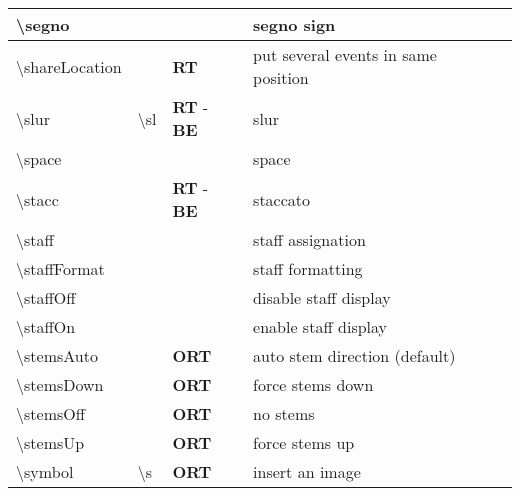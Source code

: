 \documentclass[a4paper, landscape, 11pt]{article}
\begin{document}
\begin{tabularx}{\linewidth}{p{3cm}p{5cm}lll}
    \hline
    \textbackslash{}segno&&&segno sign&\\
    \hline
    \textbackslash{}shareLocation&&\textbf{RT}&put several events in same position&\\
    \hline
    \textbackslash{}slur&\textbackslash{}sl&\textbf{RT} - \textbf{BE}&slur&\\
    \hline
    \textbackslash{}space&&&space&\\
    \hline
    \textbackslash{}stacc&&\textbf{RT} - \textbf{BE}&staccato&\\
    \hline
    \textbackslash{}staff&&&staff assignation&\\
    \hline
    \textbackslash{}staffFormat&&&staff formatting&\\
    \hline
    \textbackslash{}staffOff&&&disable staff display&\\
    \hline
    \textbackslash{}staffOn&&&enable staff display&\\
    \hline
    \textbackslash{}stemsAuto&&\textbf{ORT}&auto stem direction (default)&\\
    \hline
    \textbackslash{}stemsDown&&\textbf{ORT}&force stems down&\\
	\hline
    \textbackslash{}stemsOff&&\textbf{ORT}&no stems&\\
    \hline
    \textbackslash{}stemsUp&&\textbf{ORT}&force stems up&\\
    \hline
    \textbackslash{}symbol&\textbackslash{}s&\textbf{ORT}&insert an image&\\
    \hline
\end{tabularx}
%
%
\end{document}
